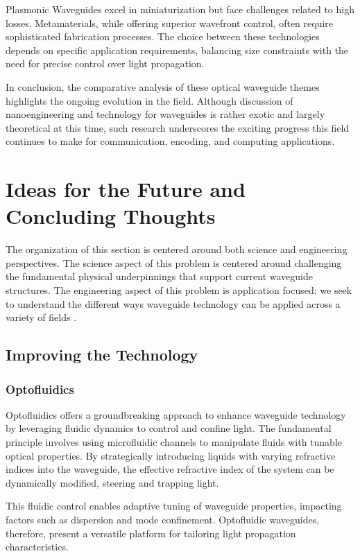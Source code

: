\documentclass[10pt]{article}
\begin{document}
Plasmonic Waveguides excel in miniaturization but face challenges related to high losses. Metamaterials, while offering superior wavefront control, often require sophisticated fabrication processes. The choice between these technologies depends on specific application requirements, balancing size constraints with the need for precise control over light propagation.

In conclusion, the comparative analysis of these optical waveguide themes highlights the ongoing evolution in the field.
Although discussion of nanoengineering and technology for waveguides is rather exotic and largely theoretical at this time, 
such research underscores the exciting progress this field continues to make for communication, encoding, and computing applications.

\section{Ideas for the Future and Concluding Thoughts}

The organization of this section is centered around both science and engineering perspectives.
The science aspect of this problem is centered around challenging the fundamental physical underpinnings that support
current waveguide structures. The engineering aspect of this problem is application focused: we seek to understand the
different ways waveguide technology can be applied across a variety of fields \cite{ref04}.



\subsection{Improving the Technology}


\subsubsection{Optofluidics}
Optofluidics offers a groundbreaking approach to enhance waveguide technology by leveraging fluidic dynamics to control and confine light.
The fundamental principle involves using microfluidic channels to manipulate fluids with tunable optical properties.
By strategically introducing liquids with varying refractive indices into the waveguide,
the effective refractive index of the system can be dynamically modified, steering and trapping light.


This fluidic control enables adaptive tuning of waveguide properties,
impacting factors such as dispersion and mode confinement. Optofluidic waveguides,
therefore, present a versatile platform for tailoring light propagation characteristics.
\end{document}
